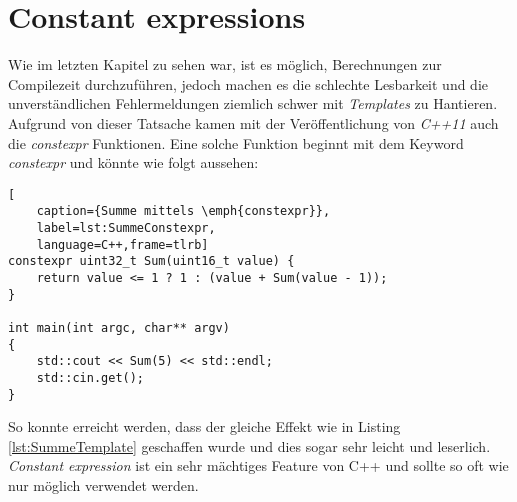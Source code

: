 \section{Constant expressions}\label{sec:constexpr}
Wie im letzten Kapitel \emph{} zu sehen war, ist es möglich, Berechnungen
zur Compilezeit durchzuführen, jedoch machen es die schlechte Lesbarkeit und die unverständlichen
Fehlermeldungen ziemlich schwer mit \emph{Templates} zu Hantieren. Aufgrund von dieser Tatsache
kamen mit der Veröffentlichung von \emph{C++11} auch die \emph{constexpr} Funktionen. Eine solche
Funktion beginnt mit dem Keyword \emph{constexpr} und könnte wie folgt aussehen:

\begin{lstlisting}[
    caption={Summe mittels \emph{constexpr}},
    label=lst:SummeConstexpr,
    language=C++,frame=tlrb]
constexpr uint32_t Sum(uint16_t value) {
	return value <= 1 ? 1 : (value + Sum(value - 1));
}

int main(int argc, char** argv)
{
	std::cout << Sum(5) << std::endl;
	std::cin.get();
}
\end{lstlisting}

So konnte erreicht werden, dass der gleiche Effekt wie in Listing \ref{lst:SummeTemplate} 
geschaffen wurde und dies sogar sehr leicht und leserlich. \emph{Constant expression} ist ein sehr
mächtiges Feature von C++ und sollte so oft wie nur möglich verwendet werden.